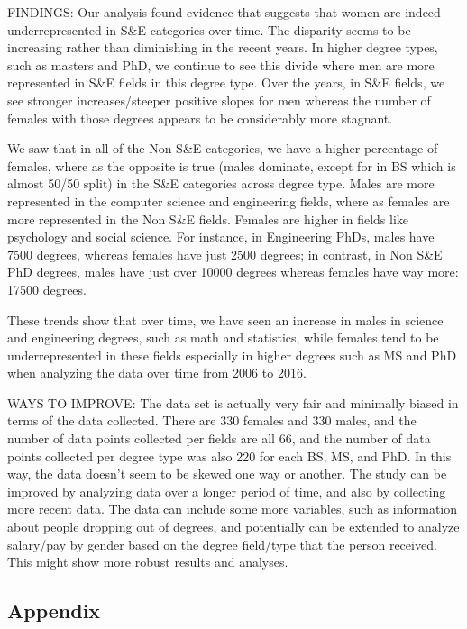\documentclass[
]{article}
\begin{document}
FINDINGS: Our analysis found evidence that suggests that women are
indeed underrepresented in S\&E categories over time. The disparity
seems to be increasing rather than diminishing in the recent years. In
higher degree types, such as masters and PhD, we continue to see this
divide where men are more represented in S\&E fields in this degree
type. Over the years, in S\&E fields, we see stronger increases/steeper
positive slopes for men whereas the number of females with those degrees
appears to be considerably more stagnant.

We saw that in all of the Non S\&E categories, we have a higher
percentage of females, where as the opposite is true (males dominate,
except for in BS which is almost 50/50 split) in the S\&E categories
across degree type. Males are more represented in the computer science
and engineering fields, where as females are more represented in the Non
S\&E fields. Females are higher in fields like psychology and social
science. For instance, in Engineering PhDs, males have 7500 degrees,
whereas females have just 2500 degrees; in contrast, in Non S\&E PhD
degrees, males have just over 10000 degrees whereas females have way
more: 17500 degrees.

These trends show that over time, we have seen an increase in males in
science and engineering degrees, such as math and statistics, while
females tend to be underrepresented in these fields especially in higher
degrees such as MS and PhD when analyzing the data over time from 2006
to 2016.

WAYS TO IMPROVE: The data set is actually very fair and minimally biased
in terms of the data collected. There are 330 females and 330 males, and
the number of data points collected per fields are all 66, and the
number of data points collected per degree type was also 220 for each
BS, MS, and PhD. In this way, the data doesn't seem to be skewed one way
or another. The study can be improved by analyzing data over a longer
period of time, and also by collecting more recent data. The data can
include some more variables, such as information about people dropping
out of degrees, and potentially can be extended to analyze salary/pay by
gender based on the degree field/type that the person received. This
might show more robust results and analyses.

\hypertarget{appendix}{%
\subsection{Appendix}\label{appendix}}
\end{document}
